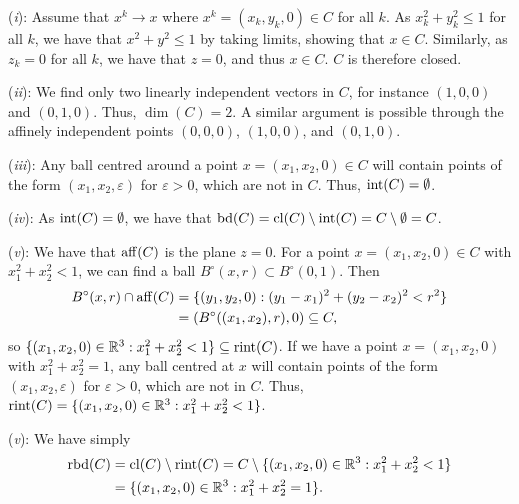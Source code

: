\begin{solution}
  (\textit{i}): Assume that $x^k \to x$ where $x^k = (x_k, y_k, 0) \in C$ for all $k$.
  As $x_k^2 + y_k^2 \leq 1$ for all $k$, we have that $x^2 + y^2 \leq 1$ by taking limits, showing that $x \in C$.
  Similarly, as $z_k = 0$ for all $k$, we have that $z = 0$, and thus $x \in C$.
  $C$ is therefore closed.

  (\textit{ii}): We find only two linearly independent vectors in $C$, for instance $(1, 0, 0)$ and $(0, 1, 0)$.
  Thus, $\dim(C) = 2$.
  A similar argument is possible through the affinely independent points $(0, 0, 0)$, $(1, 0, 0)$, and $(0, 1, 0)$.

  (\textit{iii}): Any ball centred around a point $x = (x_1, x_2, 0) \in C$ will contain points of the form $(x_1, x_2, \varepsilon)$ for $\varepsilon > 0$, which are not in $C$.
  Thus, $\operatorname*{int}(C) = \emptyset$.

  (\textit{iv}): As $\operatorname*{int}(C) = \emptyset$, we have that $\operatorname*{bd}(C) = \operatorname*{cl}(C) \setminus \operatorname*{int}(C) = C \setminus \emptyset = C$.

  (\textit{v}): We have that $\operatorname*{aff}(C)$ is the plane $z = 0$.
  For a point $x = (x_1, x_2, 0) \in C$ with $x_1^2 + x_2^2 < 1$, we can find a ball $B^\circ(x, r) \subset B^\circ(0, 1)$.
  Then
  \begin{equation}
    \begin{split}
      B^\circ(x, r) \cap \operatorname*{aff}(C)
      &= \{ (y_1, y_2, 0) : (y_1 - x_1)^2 + (y_2 - x_2)^2 < r^2 \} \\
      &= (B^\circ((x_1, x_2), r), 0) \subseteq C,
    \end{split}
  \end{equation}
  so $\{ (x_1, x_2, 0) \in \mathbb{R}^3 : x_1^2 + x_2^2 < 1 \} \subseteq \operatorname*{rint}(C)$.
  If we have a point $x = (x_1, x_2, 0)$ with $x_1^2 + x_2^2 = 1$, any ball centred at $x$ will contain points of the form $(x_1, x_2, \varepsilon)$ for $\varepsilon > 0$, which are not in $C$.
  Thus, $\operatorname*{rint}(C) = \{ (x_1, x_2, 0) \in \mathbb{R}^3 : x_1^2 + x_2^2 < 1 \}$.

  (\textit{v}): We have simply
  \begin{equation}
    \begin{split}
      \operatorname*{rbd}(C) &= \operatorname*{cl}(C) \setminus \operatorname*{rint}(C) = C \setminus \{ (x_1, x_2, 0) \in \mathbb{R}^3 : x_1^2 + x_2^2 < 1 \} \\
      &= \{ (x_1, x_2, 0) \in \mathbb{R}^3 : x_1^2 + x_2^2 = 1 \}.
    \end{split}
  \end{equation}
\end{solution}


